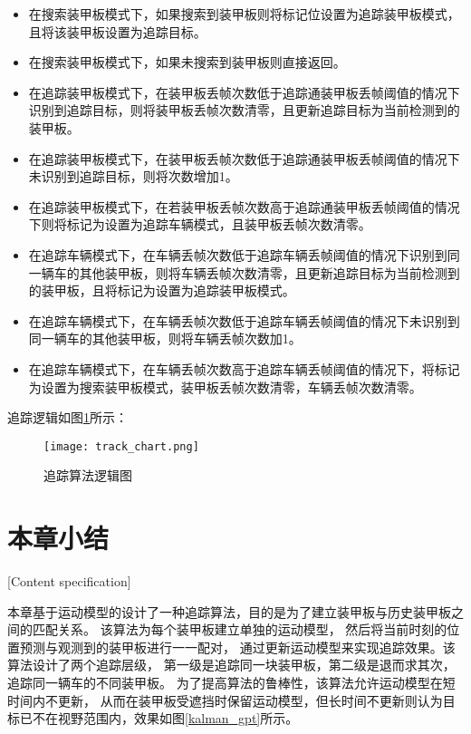 \begin{itemize}[itemindent=2em]
\item 在搜索装甲板模式下，如果搜索到装甲板则将标记位设置为追踪装甲板模式，且将该装甲板设置为追踪目标。
\item 在搜索装甲板模式下，如果未搜索到装甲板则直接返回。
\item 在追踪装甲板模式下，在装甲板丢帧次数低于追踪通装甲板丢帧阈值的情况下识别到追踪目标，则将装甲板丢帧次数清零，且更新追踪目标为当前检测到的装甲板。
\item 在追踪装甲板模式下，在装甲板丢帧次数低于追踪通装甲板丢帧阈值的情况下未识别到追踪目标，则将次数增加1。
\item 在追踪装甲板模式下，在若装甲板丢帧次数高于追踪通装甲板丢帧阈值的情况下则将标记为设置为追踪车辆模式，且装甲板丢帧次数清零。
\item 在追踪车辆模式下，在车辆丢帧次数低于追踪车辆丢帧阈值的情况下识别到同一辆车的其他装甲板，则将车辆丢帧次数清零，且更新追踪目标为当前检测到的装甲板，且将标记为设置为追踪装甲板模式。
\item 在追踪车辆模式下，在车辆丢帧次数低于追踪车辆丢帧阈值的情况下未识别到同一辆车的其他装甲板，则将车辆丢帧次数加1。
\item 在追踪车辆模式下，在车辆丢帧次数高于追踪车辆丢帧阈值的情况下，将标记为设置为搜索装甲板模式，装甲板丢帧次数清零，车辆丢帧次数清零。
\end{itemize}

追踪逻辑如图\ref{追踪算法逻辑图}所示：

\begin{figure}[H]
    \centering
    \texttt{[image: track\_chart.png]} 
    \caption{追踪算法逻辑图} 
    \label{追踪算法逻辑图} 
\end{figure} 

\par

\section{本章小结}[Content specification]


本章基于运动模型的设计了一种追踪算法，目的是为了建立装甲板与历史装甲板之间的匹配关系。
该算法为每个装甲板建立单独的运动模型，
然后将当前时刻的位置预测与观测到的装甲板进行一一配对，
通过更新运动模型来实现追踪效果。该算法设计了两个追踪层级，
第一级是追踪同一块装甲板，第二级是退而求其次，追踪同一辆车的不同装甲板。
为了提高算法的鲁棒性，该算法允许运动模型在短时间内不更新，
从而在装甲板受遮挡时保留运动模型，但长时间不更新则认为目标已不在视野范围内，效果如图\ref{kalman_gpt}所示。

